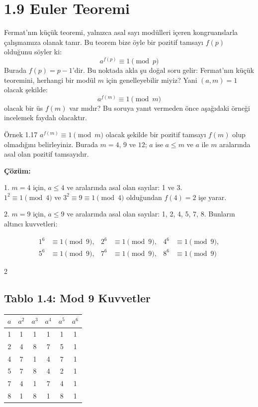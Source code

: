 \documentclass[12pt]{article}
\begin{document}
\section*{1.9 Euler Teoremi}

Fermat'nın küçük teoremi, yalnızca asal sayı modülleri içeren kongruanslarla çalışmamıza olanak tanır. Bu teorem bize öyle bir pozitif tamsayı $f(p)$ olduğunu söyler ki:
\[
a^{f(p)} \equiv 1 \pmod{p}
\]
Burada $f(p) = p - 1$'dir. Bu noktada akla şu doğal soru gelir: Fermat'nın küçük teoremini, herhangi bir modül $m$ için genelleyebilir miyiz? Yani $(a, m) = 1$ olacak şekilde:
\[
a^{f(m)} \equiv 1 \pmod{m}
\]
olacak bir üs $f(m)$ var mıdır? Bu soruya yanıt vermeden önce aşağıdaki örneği incelemek faydalı olacaktır.

\begin{examplebox}{Örnek 1.17}
$a^{f(m)} \equiv 1 \pmod{m}$ olacak şekilde bir pozitif tamsayı $f(m)$ olup olmadığını belirleyiniz. Burada $m = 4$, $9$ ve $12$; $a$ ise $a \leq m$ ve $a$ ile $m$ aralarında asal olan pozitif tamsayıdır.

\textbf{Çözüm:}

1. $m = 4$ için, $a \leq 4$ ve aralarında asal olan sayılar: 1 ve 3. \\
$1^2 \equiv 1 \pmod{4}$ ve $3^2 \equiv 9 \equiv 1 \pmod{4}$ olduğundan $f(4) = 2$ işe yarar.

2. $m = 9$ için, $a \leq 9$ ve aralarında asal olan sayılar: 1, 2, 4, 5, 7, 8. Bunların altıncı kuvvetleri:

\[
\begin{aligned}
1^6 &\equiv 1 \pmod{9}, & 2^6 &\equiv 1 \pmod{9}, & 4^6 &\equiv 1 \pmod{9}, \\
5^6 &\equiv 1 \pmod{9}, & 7^6 &\equiv 1 \pmod{9}, & 8^6 &\equiv 1 \pmod{9}
\end{aligned}
\]

\begin{multicols}{2}
\subsection*{Tablo 1.4: Mod 9 Kuvvetler}
\begin{center}
\begin{tabular}{c|ccccc}
\toprule
$a$ & $a^2$ & $a^3$ & $a^4$ & $a^5$ & $a^6$ \\
\midrule
1 & 1 & 1 & 1 & 1 & 1 \\
2 & 4 & 8 & 7 & 5 & 1 \\
4 & 7 & 1 & 4 & 7 & 1 \\
5 & 7 & 8 & 4 & 2 & 1 \\
7 & 4 & 1 & 7 & 4 & 1 \\
8 & 1 & 8 & 1 & 8 & 1 \\
\bottomrule
\end{tabular}
\end{center}


\end{multicols}
\end{examplebox}
\end{document}
